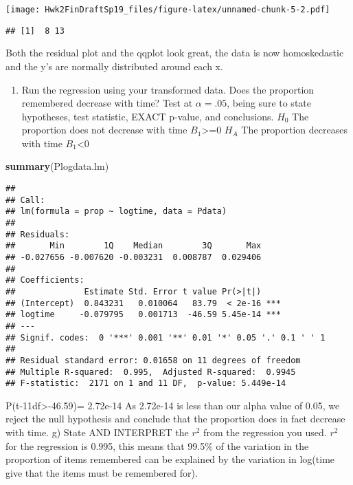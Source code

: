\documentclass[12pt,]{article}
\newenvironment{Shaded}{\begin{snugshade}}{\end{snugshade}}
\newcommand{\KeywordTok}[1]{\textcolor[rgb]{0.13,0.29,0.53}{\textbf{#1}}}
\newcommand{\NormalTok}[1]{#1}
\providecommand{\tightlist}{%
  \setlength{\itemsep}{0pt}\setlength{\parskip}{0pt}}
\begin{document}
\texttt{[image: Hwk2FinDraftSp19\_files/figure-latex/unnamed-chunk-5-2.pdf]}

\begin{verbatim}
## [1]  8 13
\end{verbatim}

Both the residual plot and the qqplot look great, the data is now
homoskedastic and the y's are normally distributed around each x.

\begin{enumerate}
\def\labelenumi{\alph{enumi})}
\setcounter{enumi}{5}
\tightlist
\item
  Run the regression using your transformed data. Does the proportion
  remembered decrease with time? Test at \(\alpha = .05\), being sure to
  state hypotheses, test statistic, EXACT p-value, and conclusions.
  \(H_0\) The proportion does not decrease with time
  \(B_1\)\textgreater{}=0 \(H_A\) The proportion decreases with time
  \(B_1\)\textless{}0
\end{enumerate}

\begin{Shaded}
\begin{Highlighting}[]
\KeywordTok{summary}\NormalTok{(Plogdata.lm)}
\end{Highlighting}
\end{Shaded}

\begin{verbatim}
## 
## Call:
## lm(formula = prop ~ logtime, data = Pdata)
## 
## Residuals:
##       Min        1Q    Median        3Q       Max 
## -0.027656 -0.007620 -0.003231  0.008787  0.029406 
## 
## Coefficients:
##              Estimate Std. Error t value Pr(>|t|)    
## (Intercept)  0.843231   0.010064   83.79  < 2e-16 ***
## logtime     -0.079795   0.001713  -46.59 5.45e-14 ***
## ---
## Signif. codes:  0 '***' 0.001 '**' 0.01 '*' 0.05 '.' 0.1 ' ' 1
## 
## Residual standard error: 0.01658 on 11 degrees of freedom
## Multiple R-squared:  0.995,  Adjusted R-squared:  0.9945 
## F-statistic:  2171 on 1 and 11 DF,  p-value: 5.449e-14
\end{verbatim}

P(t-11df\textgreater{}-46.59)= 2.72e-14 As 2.72e-14 is less than our
alpha value of 0.05, we reject the null hypothesis and conclude that the
proportion does in fact decrease with time. g) State AND INTERPRET the
\(r^2\) from the regression you used. \(r^2\) for the regression is
0.995, this means that 99.5\% of the variation in the proportion of
items remembered can be explained by the variation in log(time give that
the items must be remembered for).
\end{document}
